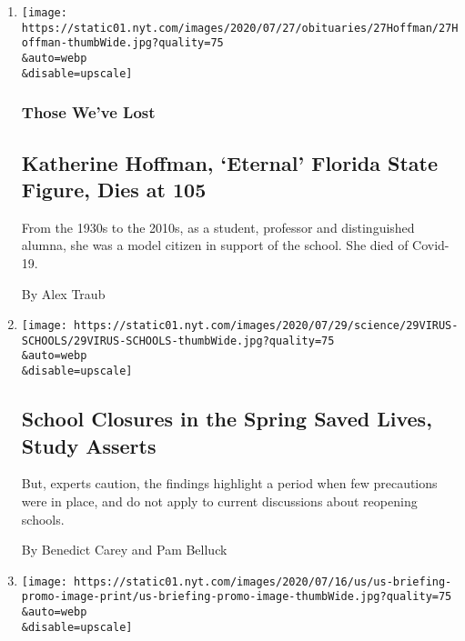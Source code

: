 \begin{enumerate}
\def\labelenumi{\arabic{enumi}.}
\item
  \href{/2020/07/29/obituaries/katherine-hoffman-dead-coronavirus.html}{}

  \texttt{[image: https://static01.nyt.com/images/2020/07/27/obituaries/27Hoffman/27Hoffman-thumbWide.jpg?quality=75\\\&auto=webp\\\&disable=upscale]}

  \hypertarget{those-weve-lost}{%
  \subsubsection{Those We've Lost}\label{those-weve-lost}}

  \hypertarget{katherine-hoffman-eternal-florida-state-figure-dies-at-105}{%
  \subsection{Katherine Hoffman, `Eternal' Florida State Figure, Dies at
  105}\label{katherine-hoffman-eternal-florida-state-figure-dies-at-105}}

  From the 1930s to the 2010s, as a student, professor and distinguished
  alumna, she was a model citizen in support of the school. She died of
  Covid-19.

  By Alex Traub
\item
  \href{/2020/07/29/health/covid-school-reopening.html}{}

  \texttt{[image: https://static01.nyt.com/images/2020/07/29/science/29VIRUS-SCHOOLS/29VIRUS-SCHOOLS-thumbWide.jpg?quality=75\\\&auto=webp\\\&disable=upscale]}

  \hypertarget{school-closures-in-the-spring-saved-lives-study-asserts}{%
  \subsection{School Closures in the Spring Saved Lives, Study
  Asserts}\label{school-closures-in-the-spring-saved-lives-study-asserts}}

  But, experts caution, the findings highlight a period when few
  precautions were in place, and do not apply to current discussions
  about reopening schools.

  By Benedict Carey and Pam Belluck
\item
  \href{/2020/07/29/world/coronavirus-covid-19.html}{}

  \texttt{[image: https://static01.nyt.com/images/2020/07/16/us/us-briefing-promo-image-print/us-briefing-promo-image-thumbWide.jpg?quality=75\\\&auto=webp\\\&disable=upscale]}


\end{enumerate}
